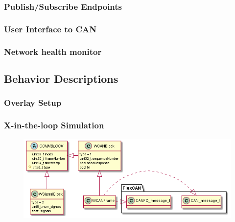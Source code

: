 \documentclass[letterpaper,twocolumn,12pt]{article}
\begin{document}
\subsubsection{Publish/Subscribe Endpoints}
\subsubsection{User Interface to CAN}
\subsubsection{Network health monitor}

\subsection{Behavior Descriptions}

\subsubsection{Overlay Setup}
\subsubsection{X-in-the-loop Simulation}
\begin{figure}[t!]
    \centering
    \includegraphics[width=\linewidth]{out/images/data_structures/data_structures.png}
    
    \caption{}
    \label{fig:}
\end{figure}
\end{document}
